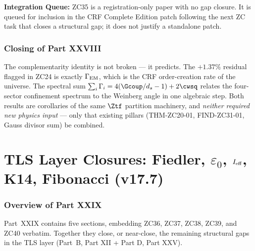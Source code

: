 \documentclass[12pt, a4paper]{article}
\begin{document}
\medskip
\noindent\textbf{Integration Queue:} ZC35 is a registration-only paper
with no gap closure. It is queued for inclusion in the CRF Complete
Edition patch following the next ZC task that closes a structural gap;
it does not justify a standalone patch.

\section*{Closing of Part XXVIII}

\begin{keybox}[title={Part XXVIII Summary}]
The complementarity identity is not broken --- it predicts. The
$+1.37\%$ residual flagged in ZC24 is exactly $\Gamma_{\rm EM}$,
which is the CRF order-creation rate of the universe. The spectral
sum $\sum_i\Gamma_i = 4(\Gcoup/d_s - 1) + 2\cwsq$ relates the
four-sector confinement spectrum to the Weinberg angle in one
algebraic step. Both results are corollaries of the same
$\Ztf$ partition machinery, and \emph{neither required new physics
input} --- only that existing pillars (THM-ZC20-01, FIND-ZC31-01,
Gauss divisor sum) be combined.
\end{keybox}

\newpage


\part{TLS Layer Closures: Fiedler, $\varepsilon_0$, $I_{\rm eff}$, K14, Fibonacci (v17.7)}
\label{part:XXIX}

\section*{Overview of Part XXIX}

Part~XXIX contains five sections, embedding ZC36, ZC37, ZC38, ZC39,
and ZC40 verbatim. Together they close, or near-close, the
remaining structural gaps in the TLS layer (Part~B, Part XII +
Part D, Part XXV).
\end{document}
